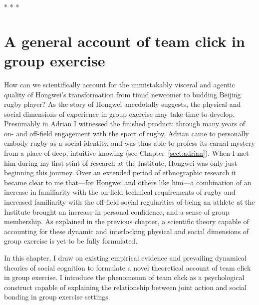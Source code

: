 \begin{CJK}{UTF8}{gbsn}
                          \begin{center}
                              * * *
                          \end{center}











\section{A general account of team click in group exercise}

How can we scientifically account for the unmistakably visceral and agentic quality of Hongwei's transformation from timid newcomer to budding Beijing rugby player?  As the story of Hongwei anecdotally suggests, the physical and social dimensions of experience in group exercise may take time to develop.  Presumably in Adrian I witnessed the finished product: through many years of on- and off-field engagement with the sport of rugby, Adrian came to personally embody rugby as a social identity, and was thus able to profess its carnal mystery from a place of deep, intuitive knowing (see Chapter~\ref{sect:adrian}).  When I met him during my first stint of research at the Institute, Hongwei was only just beginning this journey.  Over an extended period of ethnographic research it became clear to me that---for Hongwei and others like him---a combination of an increase in familiarity with the on-field technical requirements of rugby and increased familiarity with the off-field social regularities of being an athlete at the Institute brought an increase in personal confidence, and a sense of group membership.  As explained in the previous chapter, a scientific theory capable of accounting for these dynamic and interlocking physical and social dimensions of group exercise is yet to be fully formulated.

In this chapter, I draw on existing empirical evidence and prevailing dynamical theories of social cognition to formulate a novel theoretical account of team click in group exercise.  I introduce the phenomenon of team click as a psychological construct capable of explaining the relationship between joint action and social bonding in group exercise settings.


\end{CJK}
